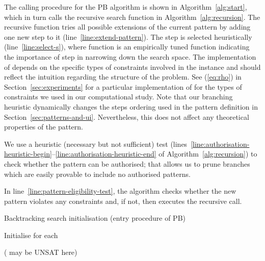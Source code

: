 \documentclass[runningheads,proof]{llncs}
\begin{document}
The calling procedure for the PB algorithm is shown in Algorithm~\ref{alg:start}, which in turn calls the recursive search function in Algorithm~\ref{alg:recursion}. 
The recursive function tries all possible extensions  of the current pattern  by adding one new step  to it (line~\ref{line:extend-pattern}).
The step  is selected heuristically (line~\ref{line:select-s}), where function  is an empirically tuned function indicating the importance of step  in narrowing down the search space.  
The implementation of  depends on the specific types of constraints involved in the instance and should reflect the intuition regarding the structure of the problem.
See (\ref{eq:rho}) in Section~\ref{sec:experiments} for a particular implementation of  for the types of constraints we used in our computational study.
Note that our branching heuristic dynamically changes the steps ordering used in the pattern definition in Section~\ref{sec:patterns-and-ui}.
Nevertheless, this does not affect any theoretical properties of the pattern.

We use a heuristic (necessary but not sufficient) test (lines~\ref{line:authorisation-heuristic-begin}--\ref{line:authorisation-heuristic-end} of Algorithm~\ref{alg:recursion}) to check whether the pattern  can be authorised; that allows us to prune branches which are easily provable to include no authorised patterns.

In line~\ref{line:pattern-eligibility-test}, the algorithm checks whether the new pattern  violates any constraints and, if not, then executes the recursive call.




\begin{algorithm}[tb]
\caption{Backtracking search initialisation (entry procedure of PB)\label{alg:start}}

Initialise  for each \;
\;

\Return{} ( may be UNSAT here)\;
\end{algorithm}
\end{document}
